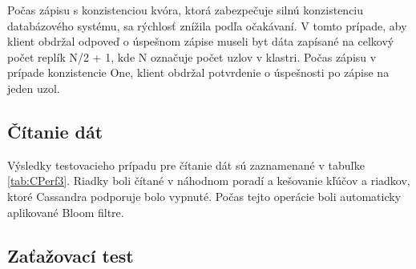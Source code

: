 \documentclass[11pt,twoside,a4paper]{book}
\begin{document}
Počas zápisu s konzistenciou kvóra, ktorá zabezpečuje silnú konzistenciu databázového systému, sa rýchlosť znížila podľa očakávaní. V tomto prípade, aby klient obdržal odpoveď o úspešnom zápise museli byt dáta zapísané na celkový počet replík N/2 + 1, kde N označuje počet uzlov v klastri. Počas zápisu v prípade konzistencie One, klient obdržal potvrdenie o úspešnosti po zápise na jeden uzol.

\subsection*{Čítanie dát}

Výsledky testovacieho prípadu pre čítanie dát sú zaznamenané v tabuľke \ref{tab:CPerf3}. Riadky boli čítané v náhodnom poradí a kešovanie kľúčov a riadkov, ktoré Cassandra podporuje bolo vypnuté. Počas tejto operácie boli automaticky aplikované Bloom filtre.



\subsection*{Zaťažovací test}
\end{document}
